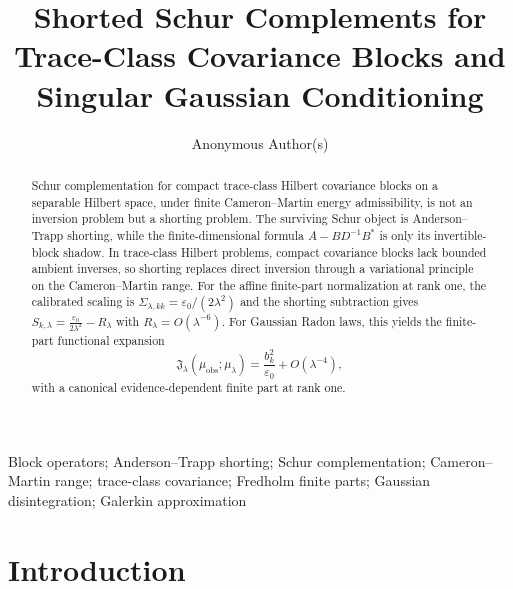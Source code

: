 \documentclass[preprint,12pt]{elsarticle}
\theoremstyle{plain}
\theoremstyle{definition}
\theoremstyle{remark}
\begin{document}
\begin{frontmatter}

\title{Shorted Schur Complements for Trace-Class Covariance Blocks and Singular Gaussian Conditioning}

\author{Anonymous Author(s)}

\begin{abstract}
        Schur complementation for compact trace-class Hilbert covariance blocks
        on a separable Hilbert space, under finite Cameron--Martin energy
        admissibility, is not an inversion problem but a shorting problem.  The surviving Schur
        object is Anderson--Trapp shorting, while the finite-dimensional formula
        $A-BD^{-1}B^*$ is only its invertible-block shadow.  In trace-class
        Hilbert problems, compact covariance blocks lack bounded ambient inverses,
        so shorting replaces direct inversion through a variational principle on
        the Cameron--Martin range.  For the affine finite-part normalization at rank one, the calibrated scaling is
        $\Sigma_{\lambda,kk}=\varepsilon_0/(2\lambda^2)$ and the shorting
        subtraction gives $S_{k,\lambda}=\frac{\varepsilon_0}{2\lambda^2}-R_\lambda$
        with $R_\lambda=O(\lambda^{-6})$.
        For Gaussian Radon laws, this yields the finite-part functional expansion
        \[
        \mathfrak{J}_\lambda(\mu_{\mathrm{obs}};\mu_\lambda)
        =
        \frac{b_k^2}{\varepsilon_0}+O(\lambda^{-4}),
        \]
        with a canonical evidence-dependent finite part at rank one.
    \end{abstract}

    \begin{keyword}
Block operators; Anderson--Trapp shorting; Schur complementation; Cameron--Martin range; trace-class covariance; Fredholm finite parts; Gaussian disintegration; Galerkin approximation
\end{keyword}

\end{frontmatter}

    \section{Introduction}
    \label{sec:intro}
\end{document}
